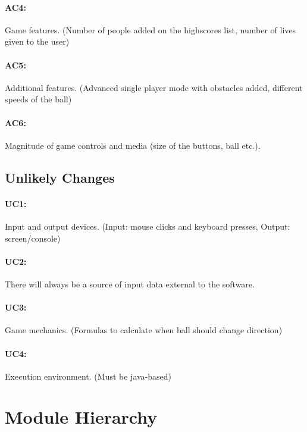 \documentclass[12pt,letterpaper]{article}
\begin{document}
	\paragraph{AC4:}	Game features. (Number of people added on the highscores list, number of lives given to the user)
	\paragraph{AC5:}	Additional features. (Advanced single player mode with obstacles added, different speeds of the ball)
	\paragraph{AC6:}	Magnitude of game controls and media (size of the buttons, ball etc.).
	
	\subsection{Unlikely Changes}
	\paragraph{UC1:}	Input and output devices. (Input: mouse clicks and keyboard presses, Output: screen/console)
	\paragraph{UC2:}	There will always be a source of input data external to the software.
	\paragraph{UC3:}	Game mechanics. (Formulas to calculate when ball should change direction) 
	\paragraph{UC4:}	Execution environment. (Must be java-based)

	\section{Module Hierarchy}
\end{document}
